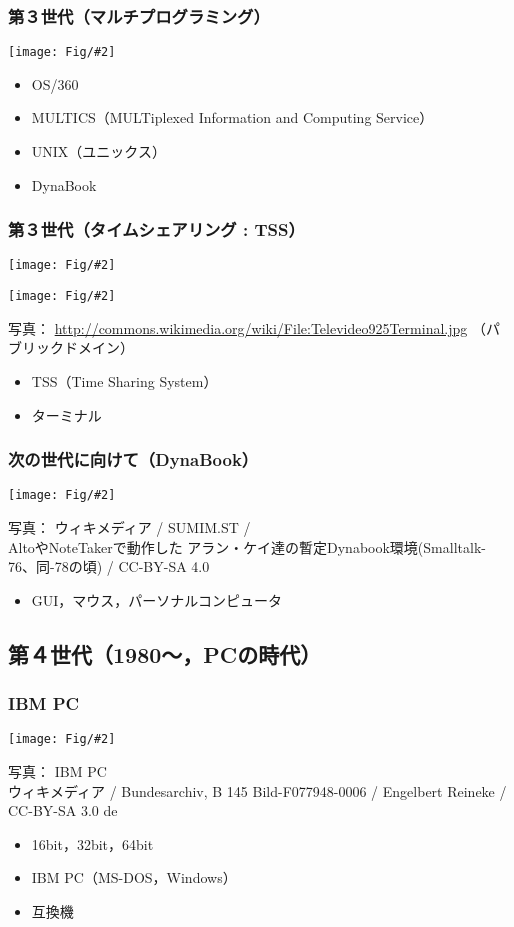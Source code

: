 \documentclass[dvipdfmx]{beamer}
\newcommand{\fig}[2]{\begin{center}\texttt{[image: Fig/\#2]}\end{center}}
\begin{document}
\begin{frame}
  \frametitle{第３世代（マルチプログラミング）}
  \fig{scale=0.7}{multiprogramming-crop.pdf}
  \begin{itemize}
    \item OS/360
    \item MULTICS（MULTiplexed Information and Computing Service）
    \item UNIX（ユニックス）
    \item DynaBook
  \end{itemize}
\end{frame}

\begin{frame}
  \frametitle{第３世代（タイムシェアリング : TSS）}
  \fig{scale=0.5}{timesharing-crop.pdf}
  \fig{scale=0.15}{724px-Televideo925Terminal.jpeg}
  \begin{center}
    {\tiny 写真：
      \url{http://commons.wikimedia.org/wiki/File:Televideo925Terminal.jpg}
（パブリックドメイン）}
  \end{center}
  \begin{itemize}
    \item TSS（Time Sharing System）
    \item ターミナル
  \end{itemize}
\end{frame}

\begin{frame}
  \frametitle{次の世代に向けて（DynaBook）}
  \fig{scale=0.3}{Smalltalk-76.png}
  \begin{center}
    {\tiny 写真：
      ウィキメディア /
      SUMIM.ST /\\
      AltoやNoteTakerで動作した
      アラン・ケイ達の暫定Dynabook環境(Smalltalk-76、同-78の頃) /
      CC-BY-SA 4.0}
  \end{center}
  \begin{itemize}
    \item GUI，マウス，パーソナルコンピュータ
  \end{itemize}
\end{frame}

\subsection{第４世代（1980〜，PCの時代）}
\begin{frame}
  \frametitle{IBM PC}
  \fig{scale=0.2}
   {Bundesarchiv_B_145_Bild-F077948-0006,_Jugend-Computerschule_mit_IBM-PC.jpg}
      {\tiny
        \begin{center}
          写真： IBM PC \\
          ウィキメディア /
          Bundesarchiv, B 145 Bild-F077948-0006 /
          Engelbert Reineke / CC-BY-SA 3.0 de
        \end{center}
      }
  \begin{itemize}
    \item 16bit，32bit，64bit
    \item IBM PC（MS-DOS，Windows）
    \item 互換機
  \end{itemize}
\end{frame}
\end{document}
